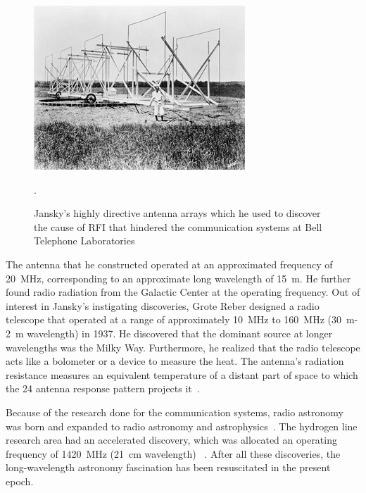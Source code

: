 \begin{figure}
	\begin{center}
		\includegraphics[width=0.7\linewidth]{Figures/jansky1}
		\caption{Jansky's highly directive antenna arrays which he used to discover the cause of RFI that hindered the communication systems at Bell Telephone Laboratories~\citep{book:BasicsofRA}}.
		\label{Fig:Jansky}
	\end{center}
\end{figure}

The antenna that he constructed operated at an approximated frequency of \SI{20}{MHz}, corresponding to an approximate long wavelength of \SI{15}{m}. He further found radio radiation from the Galactic Center at the operating frequency. Out of interest in Jansky's instigating discoveries, Grote Reber designed a radio telescope that operated at a range of approximately \SI{10}{MHz} to \SI{160}{MHz} (\SI{30}{m}-\SI{2}{m} wavelength) in 1937. He discovered that the dominant source at longer wavelengths was the Milky Way. Furthermore, he realized that the radio telescope acts like a bolometer or a device to measure the heat. The antenna's radiation resistance measures an equivalent temperature of a distant part of space to which the 24 antenna response pattern projects it~\citep{1988JRASC..82...93R, CosmicStatic,2012PASP..124.1090H}.

Because of the research done for the communication systems, radio astronomy was born and expanded to radio astronomy and astrophysics~\citep{2012PASP..124.1090H}. The hydrogen line research area had an accelerated discovery, which was allocated an operating frequency of \SI{1420}{MHz} (\SI{21}{cm} wavelength) ~\citep{10.2307/530765}. After all these discoveries, the long-wavelength astronomy fascination has been resuscitated in the present epoch.

